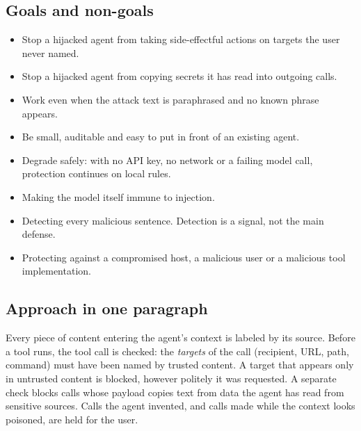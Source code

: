 \documentclass[11pt,a4paper]{article}
\begin{document}
\subsection{Goals and non-goals}
\begin{description}[leftmargin=2.2cm,labelwidth=2cm,style=nextline]
  \item[Goals]
    \begin{itemize}
      \item Stop a hijacked agent from taking side-effectful actions on targets the user never named.
      \item Stop a hijacked agent from copying secrets it has read into outgoing calls.
      \item Work even when the attack text is paraphrased and no known phrase appears.
      \item Be small, auditable and easy to put in front of an existing agent.
      \item Degrade safely: with no API key, no network or a failing model call, protection continues on local rules.
    \end{itemize}
  \item[Non-goals]
    \begin{itemize}
      \item Making the model itself immune to injection.
      \item Detecting every malicious sentence. Detection is a signal, not the main defense.
      \item Protecting against a compromised host, a malicious user or a malicious tool implementation.
    \end{itemize}
\end{description}

\subsection{Approach in one paragraph}
Every piece of content entering the agent's context is labeled by its source. Before a tool runs, the tool call is checked: the \emph{targets} of the call (recipient, URL, path, command) must have been named by trusted content. A target that appears only in untrusted content is blocked, however politely it was requested. A separate check blocks calls whose payload copies text from data the agent has read from sensitive sources. Calls the agent invented, and calls made while the context looks poisoned, are held for the user.

\end{document}
